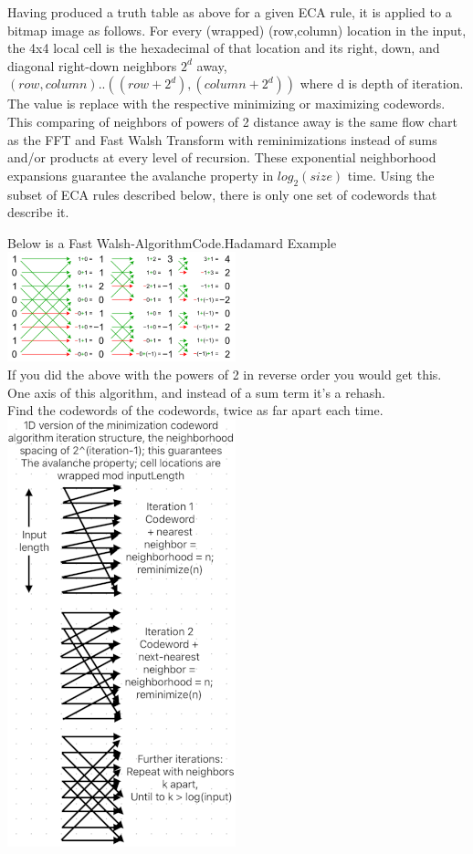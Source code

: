 \documentclass[11pt]{article}
\begin{document}
Having produced a truth table as above for a given ECA rule, it is applied to a bitmap image as follows. For every (wrapped) (row,column) location in the input, the 4x4 local cell is the hexadecimal of that location and its right, down, and diagonal right-down neighbors $2^d$ away, $(row,column)..((row+2^d),(column+2^d))$  where d is depth of iteration. The value is replace with the respective minimizing or maximizing codewords. This comparing of neighbors of powers of 2 distance away is the same flow chart as the FFT and Fast Walsh Transform with reminimizations instead of sums and/or products at every level of recursion. These exponential neighborhood expansions guarantee the avalanche property in $log_2(size)$ time. Using the subset of ECA rules described below, there is only one set of codewords that describe it.\\
\begin{center}
Below is a Fast Walsh-AlgorithmCode.Hadamard Example \cite{enwiki:1261916659}\\
\includegraphics{FastWalshHadamard}\\
If you did the above with the powers of 2 in reverse order you would get this. \\
One axis of this algorithm, and instead of a sum term it's a rehash.\\ 
Find the codewords of the codewords, twice as far apart each time.\\
\includegraphics{AlgoStruct}\\
\end{center}
\end{document}
